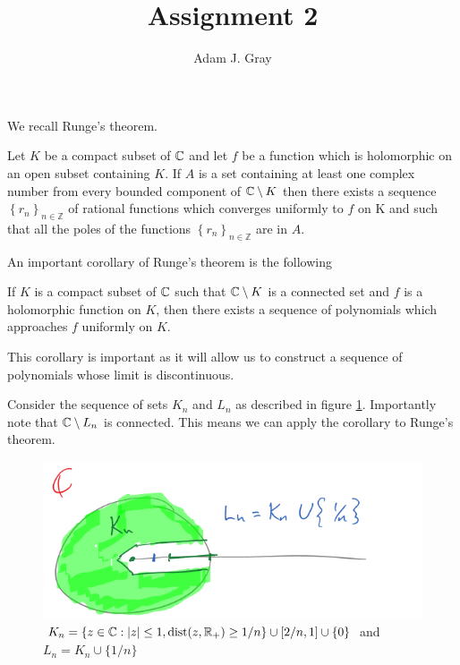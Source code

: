 \documentclass{unswmaths}
\begin{document}
\author{Adam J. Gray}
\title{Assignment 2}
\subject{Complex Analysis}

\newcommand{\llra}{\Leftrightarrow}

\unswtitle

\section{}
\section{}
We recall Runge's theorem.
\begin{theorem}
Let $K $ be a compact subset of $ \mathbb{C} $ and let $ f $ be a function which is holomorphic on an open subset containing $ K $. If $ A $ is a set containing at least one complex number from every bounded component of $ \mathbb{C} \setminus K $ then there exists a sequence $ \left\{ r_n\right\}_{n \in \mathbb{Z}} $ of rational functions which converges uniformly to $ f $ on K and such that all the poles of the functions $ \left\{ r_n\right\}_{n \in \mathbb{Z}} $ are in $ A $.  
\end{theorem}

An important corollary of Runge's theorem is the following
\begin{corollary}
	If $ K $ is a compact subset of $ \mathbb{C} $ such that $ \mathbb{C} \setminus K $ is a connected set and $ f $ is a holomorphic function on $ K $, then there exists a sequence of polynomials which approaches $ f $ uniformly on $ K $.
\end{corollary}

This corollary is important as it will allow us to construct a sequence of polynomials whose limit is discontinuous. 

Consider the sequence of sets $ K_n $ and $ L_n $ as described in figure \ref{fig:1}. Importantly note that $ \mathbb{C} \setminus L_n $ is connected. This means we can apply the corollary to Runge's theorem.
\begin{figure}[h]
	\includegraphics[scale=1]{ComplexDomainTask2Qn2}
	\caption{$K_n = \{ z \in \mathbb{C} : |z| \leq 1, \operatorname{dist}(z, \mathbb{R}_+) \geq 1/n \} \cup [2 / n, 1] \cup \{0 \}$ and $ L_n = K_n \cup \{ 1 / n \} $}
		\label{fig:1}
\end{figure}
\end{document}
